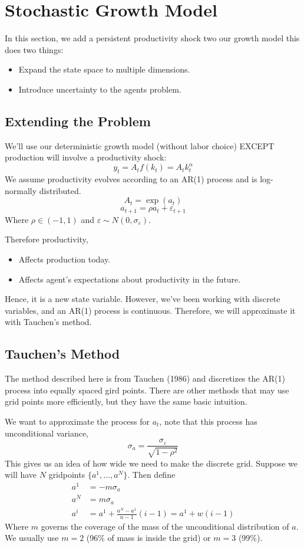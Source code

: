 \documentclass[twoside]{article}
\begin{document}
 \section{Stochastic Growth Model}
 
 In this section, we add a persistent productivity shock two our growth model this does two things:
 \begin{itemize}
 \item Expand the state space to multiple dimensions. 
 \item Introduce uncertainty to the agents problem.
 \end{itemize} 
 
 \subsection{Extending the Problem}
 
 We'll use our deterministic growth model (without labor choice) EXCEPT production will involve a productivity shock: 
 $$ y_t = A_tf(k_t) = A_t k_t^\alpha$$
 We assume productivity evolves according to an AR(1) process and is log-normally distributed. 
 $$ A_t = \exp(a_t) $$
 $$ a_{t+1} = \rho a_t + \varepsilon_{t+1} $$
 Where $\rho \in (-1, 1)$ and $\varepsilon \sim N(0, \sigma_\varepsilon)$.  
 
 Therefore productivity,
 \begin{itemize}
 \item Affects production today.
 \item Affects agent's expectations about productivity in the future. 
 \end{itemize}
 Hence, it is a new state variable. However, we've been working with discrete variables, and an AR(1) process is continuous. Therefore, we will
 approximate it with Tauchen's method. 
 
 \subsection{Tauchen's Method}
 
 The method described here is from Tauchen (1986) and discretizes the AR(1) process into equally spaced gird points. There are other methods that may use
 grid points more efficiently, but they have the same basic intuition. 
 
 We want to approximate the process for $a_t$, note that this process has unconditional variance, 
 $$ \sigma_a = \frac{\sigma_\varepsilon}{\sqrt{1 - \rho^2}}$$
 This gives us an idea of how wide we need to make the discrete grid. Suppose we will have $N$ gridpoints $\{a^1, \ldots, a^N\}$. Then define
 \begin{align*}
 a^1 &= -m\sigma_a \\
 a^N & = m \sigma_a \\
 a^i & = a^1 + \frac{a^N - a^1}{n-1}(i-1) = a^1 + w(i-1)
 \end{align*}
 Where $m$ governs the coverage of the mass of the unconditional distribution of $a$.  We usually use $m=2$ (96\% of mass is inside the grid) or $m=3$ (99\%). 
\end{document}
